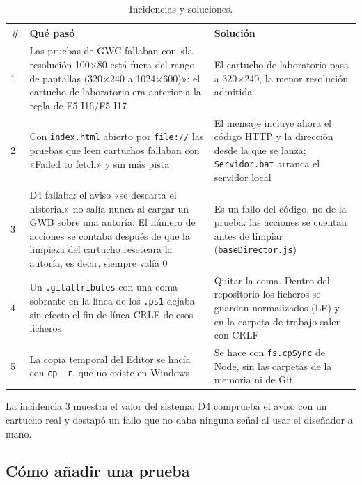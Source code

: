 \begin{table}[H]
	\centering
	\begin{tabularx}{\textwidth}{l >{\RaggedRight\arraybackslash}X >{\RaggedRight\arraybackslash}X}
		\toprule
		\textbf{\#} & \textbf{Qué pasó} & \textbf{Solución} \\
		\midrule
		1 & Las pruebas de GWC fallaban con «la resolución 100$\times$80 está fuera del rango de pantallas (320$\times$240 a 1024$\times$600)»: el cartucho de laboratorio era anterior a la regla de F5-I16/F5-I17 & El cartucho de laboratorio pasa a 320$\times$240, la menor resolución admitida \\
		2 & Con \texttt{index.html} abierto por \texttt{file://} las pruebas que leen cartuchos fallaban con «Failed to fetch» y sin más pista & El mensaje incluye ahora el código HTTP y la dirección desde la que se lanza; \texttt{Servidor.bat} arranca el servidor local \\
		3 & D4 fallaba: el aviso «se descarta el historial» no salía nunca al cargar un GWB sobre una autoría. El número de acciones se contaba después de que la limpieza del cartucho reseteara la autoría, es decir, siempre valía 0 & Es un fallo del código, no de la prueba: las acciones se cuentan antes de limpiar (\texttt{baseDirector.js}) \\
		4 & Un \texttt{.gitattributes} con una coma sobrante en la línea de los \texttt{.ps1} dejaba sin efecto el fin de línea CRLF de esos ficheros & Quitar la coma. Dentro del repositorio los ficheros se guardan normalizados (LF) y en la carpeta de trabajo salen con CRLF \\
		5 & La copia temporal del Editor se hacía con \texttt{cp -r}, que no existe en Windows & Se hace con \texttt{fs.cpSync} de Node, sin las carpetas de la memoria ni de Git \\
		\bottomrule
	\end{tabularx}
	\caption{Incidencias y soluciones.}
\end{table}

La incidencia 3 muestra el valor del sistema: D4 comprueba el aviso con un cartucho real y destapó un fallo que no daba ninguna señal al usar el diseñador a mano.

\subsection{Cómo añadir una prueba}
\label{sec:F5I18Nueva}

